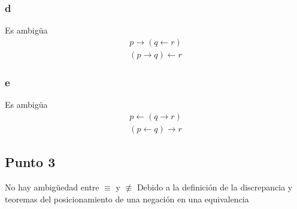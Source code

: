 \documentclass{article}
\begin{document}
\subsubsection{d}
\begin{logicenv}[5]{Es ambigüa}
    \begin{gather*}
        p \to (q \gets r)\\
        (p \to q) \gets r
    \end{gather*}
\end{logicenv}

\subsubsection{e}
\begin{logicenv}[5]{Es ambigüa}
    \begin{gather*}
        p \gets (q \to r)\\
        (p \gets q) \to r
    \end{gather*}
\end{logicenv}

\subsection{Punto 3}
\begin{logicenv}[10]{No hay ambigüedad entre $\equiv$ y $\not\equiv$}
    Debido a la definición de la discrepancia y teoremas del posicionamiento de una negación en una equivalencia
\end{logicenv}
\end{document}
